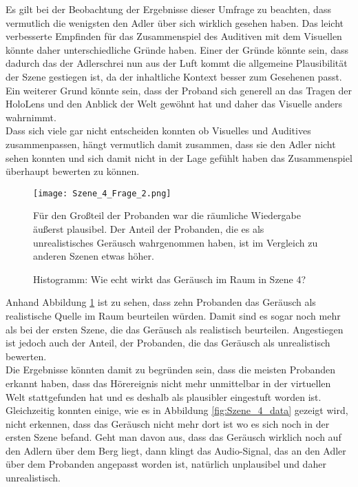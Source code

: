 Es gilt bei der Beobachtung der Ergebnisse dieser Umfrage zu beachten, dass vermutlich die wenigsten den Adler über sich wirklich gesehen haben. Das leicht verbesserte Empfinden für das Zusammenspiel des Auditiven mit dem Visuellen könnte daher unterschiedliche Gründe haben. Einer der Gründe könnte sein, dass dadurch das der Adlerschrei nun aus der Luft kommt die allgemeine Plausibilität der Szene gestiegen ist, da der inhaltliche Kontext besser zum Gesehenen passt. Ein weiterer Grund könnte sein, dass der Proband sich generell an das Tragen der HoloLens und den Anblick der Welt gewöhnt hat und daher das Visuelle anders wahrnimmt. \\ 

Dass sich viele gar nicht entscheiden konnten ob Visuelles und Auditives zusammenpassen, hängt vermutlich damit zusammen, dass sie den Adler nicht sehen konnten und sich damit nicht in der Lage gefühlt haben das Zusammenspiel überhaupt bewerten zu können. 

 \begin{figure}[H]
\centering
\texttt{[image: Szene\_4\_Frage\_2.png]}
\caption{Histogramm: Wie echt wirkt das Geräusch im Raum in Szene 4?}
Für den Großteil der Probanden war die räumliche Wiedergabe äußerst plausibel. Der Anteil der Probanden, die es als unrealistisches Geräusch wahrgenommen haben, ist im Vergleich zu anderen Szenen etwas höher.  
\label{fig:Szene_4_Frage2}
\end{figure} 

\newpage

Anhand Abbildung \ref{fig:Szene_4_Frage2} ist zu sehen, dass zehn Probanden das Geräusch als realistische Quelle im Raum beurteilen würden. Damit sind es sogar noch mehr als bei der ersten Szene, die das Geräusch als realistisch beurteilen. Angestiegen ist jedoch auch der Anteil, der Probanden, die das Geräusch als unrealistisch bewerten. \\

Die Ergebnisse könnten damit zu begründen sein, dass die meisten Probanden erkannt haben, dass das Hörereignis nicht mehr unmittelbar in der virtuellen Welt stattgefunden hat und es deshalb als plausibler eingestuft worden ist. Gleichzeitig konnten einige, wie es in Abbildung \ref{fig:Szene_4_data} gezeigt wird, nicht erkennen, dass das Geräusch nicht mehr dort ist wo es sich noch in der ersten Szene befand. Geht man davon aus, dass das Geräusch wirklich noch auf den Adlern über dem Berg liegt, dann klingt das Audio-Signal, das an den Adler über dem Probanden angepasst worden ist, natürlich unplausibel und daher unrealistisch. 

